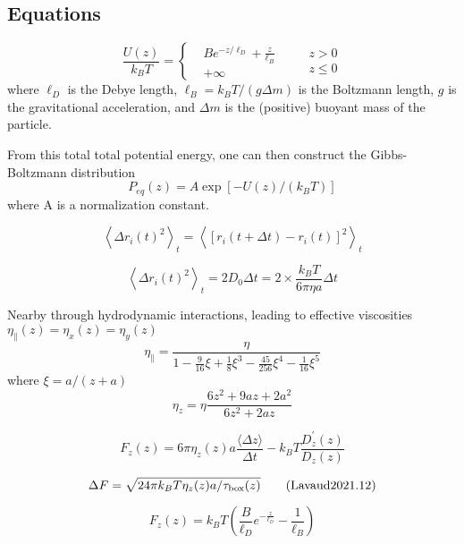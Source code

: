 \documentclass[books,12pt]{elegantpaper}
\newcommand{\ssc}{\subsection}
\newcommand{\fives}{\ \ \ \ \ }
\newcommand{\beq}{\begin{equation}}
\newcommand{\eeq}{\end{equation}}
\begin{document}
\ssc{Equations}
\begin{equation} \frac{U(z)}{k_B T} = \left\{ \begin{align} &Be^{-z/\ell_D} + \frac{z}{\ell_B} \\ &+\infty \end{align} \fives \begin{align} &z>0 \\ &z\leqslant0 \end{align} \right. \tag{Lavaud2021.1} \label{Lavaud2021.1} \end{equation}
where $\ell_D$ is the Debye length, $\ell_B = k_B T / (g\Delta m)$ is the Boltzmann length, $g$ is the gravitational acceleration, and $\Delta m$ is the (positive) buoyant mass of the particle.

From this total total potential energy, one can then construct the Gibbs-Boltzmann distribution
$$ P_{eq}(z) = A \exp \left[ -U(z) / (k_B T) \right] $$
where A is a normalization constant.

\beq \left\langle \Delta r_i (t)^2 \right\rangle_t = \left\langle \left[ r_i (t+\Delta t) - r_i(t) \right]^2 \right\rangle_t \tag{Lavaud2021.2} \label{Lavaud2021.2} \eeq


$$ \left\langle \Delta r_i (t)^2 \right\rangle_t = 2D_0 \Delta t = 2 \times \frac{k_B T}{6 \pi \eta a} \Delta t $$


Nearby through hydrodynamic interactions, leading to effective viscosities $\eta_\|(z) = \eta_x(z) = \eta_y(z)$
\beq \eta_\| = \frac{\eta}{1 - \frac{9}{16} \xi + \frac{1}{8} \xi^3 - \frac{45}{256} \xi^4 - \frac{1}{16} \xi^5} \tag{Lavaud2021.3} \label{Lavaud2021.3} \eeq
where $\xi = a/(z+a)$
\beq \eta_z = \eta \frac{6z^2 + 9az + 2a^2}{6z^2 + 2az} \tag{Lavaud2021.4} \label{Lavaud2021.4} \eeq



\beq F_z(z)= 6\pi \eta_z(z) a \frac{\langle \Delta z \rangle}{\Delta t} - k_B T \frac{D^\prime_z(z)}{D_z(z)} \tag{Lavaud2021.11} \label{Lavaud2021.11} \eeq

\beq \Delta F = \sqrt{24 \pi k_B T \eta_z(z) a / \tau_{\rm{box}}(z)} \tag{Lavaud2021.12} \label{Lavaud2021.12} \eeq

\beq F_z(z) = k_B T \left( \frac{B}{\ell_D} e^{- \frac{z}{\ell_D}} - \frac{1}{\ell_B} \right) \tag{Lavaud2021.13} \label{Lavaud2021.13} \eeq


\end{document}
